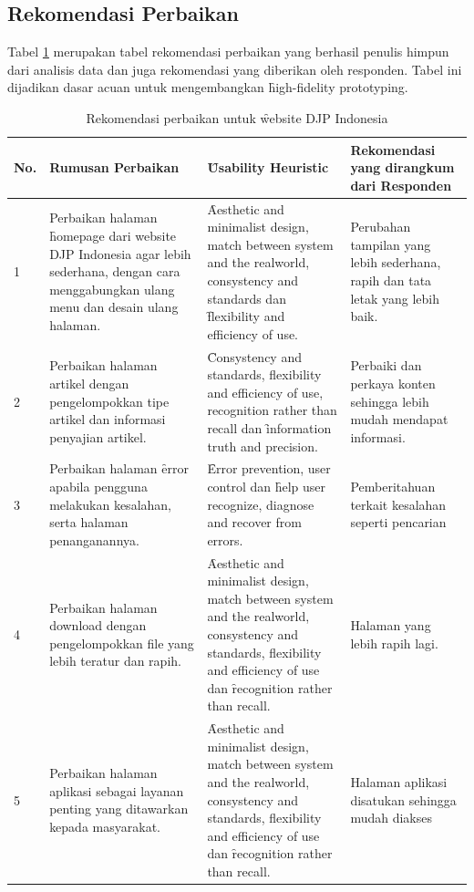 \subsection{Rekomendasi Perbaikan}
Tabel \ref{tab:perbaikan} merupakan tabel rekomendasi perbaikan yang berhasil penulis himpun dari analisis data dan juga rekomendasi yang diberikan oleh responden. Tabel ini dijadikan dasar acuan untuk mengembangkan \f{high-fidelity prototyping}.
\begin{center}

\begin{longtable}{|p{0.5cm}|p{3.8cm}|p{3.8cm}|p{4.2cm}|}
	\caption{Rekomendasi perbaikan untuk \f{website} DJP Indonesia}
	\label{tab:perbaikan} \\
			\hline
			\textbf{No.} & \textbf{Rumusan Perbaikan} & \textbf{\f{Usability Heuristic}} & \textbf{Rekomendasi yang dirangkum dari Responden} \\ \hline \endhead
			1 & Perbaikan halaman \f{homepage} dari website DJP Indonesia agar lebih sederhana, dengan cara menggabungkan ulang menu dan desain ulang halaman. & \f{Aesthetic and minimalist design, match between system and the realworld, consystency and standards} dan \f{flexibility and efficiency of use.} & Perubahan tampilan yang lebih sederhana, rapih dan tata letak yang lebih baik.\\ \hline
			2 & Perbaikan halaman artikel dengan pengelompokkan tipe artikel dan informasi penyajian artikel. & \f{Consystency and standards, flexibility and efficiency of use, recognition rather than recall} dan \f{information truth and precision.} & Perbaiki dan perkaya konten sehingga lebih mudah mendapat informasi. \\ \hline
			3 & Perbaikan halaman \f{error} apabila pengguna melakukan kesalahan, serta halaman penanganannya. & \f{Error prevention, user control} dan \f{help user recognize, diagnose and recover from errors.} & Pemberitahuan terkait kesalahan seperti pencarian  \\ \hline
			4 & Perbaikan halaman download dengan pengelompokkan file yang lebih teratur dan rapih. & \f{Aesthetic and minimalist design, match between system and the realworld, consystency and standards, flexibility and efficiency of use} dan \f{recognition rather than recall.} & Halaman yang lebih rapih lagi.  \\ \hline
			5 & Perbaikan halaman aplikasi sebagai layanan penting yang ditawarkan kepada masyarakat. & \f{Aesthetic and minimalist design, match between system and the realworld, consystency and standards, flexibility and efficiency of use} dan \f{recognition rather than recall.} & Halaman aplikasi disatukan sehingga mudah diakses  \\ \hline

\end{longtable}
\end{center}
